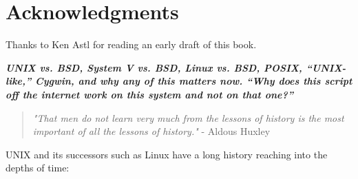 \documentclass[10pt,]{book}
\numberwithin{figure}{chapter}
\begin{document}
\section*{Acknowledgments}\label{acknowledgments}

Thanks to Ken Astl for reading an early draft of this book.


\textbf{\emph{UNIX vs. BSD, System V vs. BSD, Linux vs. BSD, POSIX,
“UNIX-like,” Cygwin, and why any of this matters now. “Why does this
script off the internet work on this system and not on that one?”}}

\begin{quote}
\emph{"That men do not learn very much from the lessons of history is
the most important of all the lessons of history."} - Aldous Huxley
\end{quote}

UNIX and its successors such as Linux have a long history reaching into
the depths of time:
\end{document}
